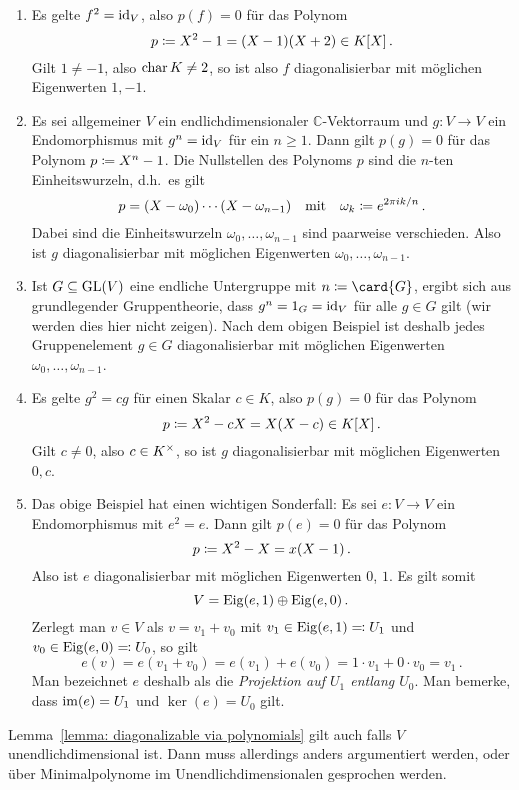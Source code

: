 \begin{example}
  \label{example: diagonalizable via polynomials}
  \leavevmode
  \begin{enumerate}
    \item
      Es gelte $f^2 = \operatorname{id}_V$, also $p(f) = 0$ für das Polynom
      \[
                  p
        \coloneqq  X^2 - 1
        =         (X - 1)(X + 2)
        \in       K[X] \,.
      \]
      Gilt $1 \neq -1$, also $\operatorname{char}{K} \neq 2$, so ist also $f$ diagonalisierbar mit möglichen Eigenwerten $1, -1$.
    \item
      Es sei allgemeiner $V$ ein endlichdimensionaler $\mathbb{C}$-Vektorraum und $g \colon V \to V$ ein Endomorphismus mit $g^n = \operatorname{id}_V$ für ein $n \geq 1$.
      Dann gilt $p(g) = 0$ für das Polynom $p \coloneqq X^n - 1$.
      Die Nullstellen des Polynoms $p$ sind die $n$-ten Einheitswurzeln, d.h.\ es gilt
      \[
        p = (X - \omega_0) \dotsm (X - \omega_{n-1})
        \quad\text{mit}\quad
        \omega_k \coloneqq e^{2 \pi i k / n} \,.
      \]
      Dabei sind die Einheitswurzeln $\omega_0, \dotsc, \omega_{n-1}$ sind paarweise verschieden.
      Also ist $g$ diagonalisierbar mit möglichen Eigenwerten $\omega_0, \dotsc, \omega_{n-1}$.
    \item
      Ist $G \subseteq \operatorname{GL}(V)$ eine endliche Untergruppe mit $n \defined \card{G}$, ergibt sich aus grundlegender Gruppentheorie, dass $g^n = 1_G = \operatorname{id}_V$ für alle $g \in G$ gilt (wir werden dies hier nicht zeigen).
      Nach dem obigen Beispiel ist deshalb jedes Gruppenelement $g \in G$ diagonalisierbar mit möglichen Eigenwerten $\omega_0, \dotsc, \omega_{n-1}$.
    \item
      Es gelte $g^2 = cg$ für einen Skalar $c \in K$, also $p(g) = 0$ für das Polynom
      \[
                  p
        \coloneqq  X^2 - cX
        =         X(X-c)
        \in       K[X] \,.
      \]
      Gilt $c \neq 0$, also $c \in K^\times$, so ist $g$ diagonalisierbar mit möglichen Eigenwerten $0, c$.
    \item
      Das obige Beispiel hat einen wichtigen Sonderfall:
      Es sei $e \colon V \to V$ ein Endomorphismus mit $e^2 = e$.
      Dann gilt $p(e) = 0$ für das Polynom
      \[
                  p
        \coloneqq  X^2 - X
        =         x(X-1) \,.
      \]
      Also ist $e$ diagonalisierbar mit möglichen Eigenwerten $0$, $1$.
      Es gilt somit
      \[
        V = \operatorname{Eig}(e, 1) \oplus \operatorname{Eig}(e, 0) \,.
      \]
      Zerlegt man $v \in V$ als $v = v_1 + v_0$ mit $v_1 \in \operatorname{Eig}(e, 1) \eqqcolon U_1$ und $v_0 \in \operatorname{Eig}(e, 0) \eqqcolon U_0$, so gilt
      \[
          e(v)
        = e(v_1 + v_0)
        = e(v_1) + e(v_0)
        = 1 \cdot v_1 + 0 \cdot v_0
        = v_1 \,.
      \]
      Man bezeichnet $e$ deshalb als die \emph{Projektion auf $U_1$ entlang $U_0$}.
      Man bemerke, dass $\operatorname{im}(e) = U_1$ und $\ker(e) = U_0$ gilt.
  \end{enumerate}
\end{example}

\begin{remark}
  Lemma~\ref{lemma: diagonalizable via polynomials} gilt auch falls $V$ unendlichdimensional ist.
  Dann muss allerdings anders argumentiert werden, oder über Minimalpolynome im Unendlichdimensionalen gesprochen werden.
\end{remark}







